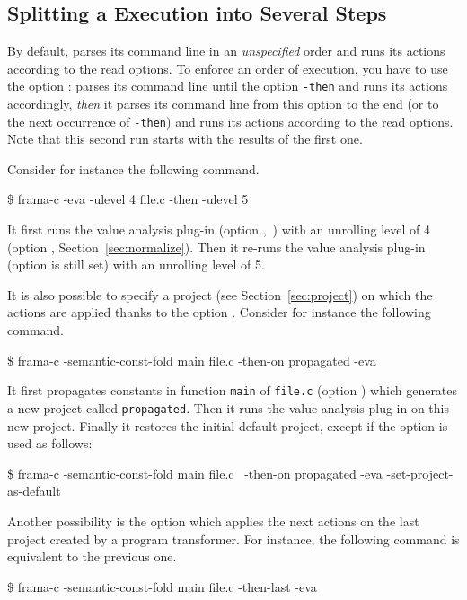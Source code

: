 \subsection{Splitting a \FramaC Execution into Several Steps}\label{sec:then}

By default, \FramaC parses its command line in an \emph{unspecified} order and
runs its actions according to the read options. To enforce an order of
execution, you have to use the option : \FramaC parses its
command line until the option \texttt{-then} and runs its actions accordingly,
\emph{then} it parses its command line from this option to the end (or to the
next occurrence of \texttt{-then}) and runs its actions according to the read
options. Note that this second run starts with the results of the first one.

Consider for instance the following command.
\begin{frama-c-commands}
\$ frama-c -eva -ulevel 4 file.c -then -ulevel 5
\end{frama-c-commands}
It first runs the value analysis plug-in (option
,~\cite{value}) with an unrolling level of 4 (option
, Section~\ref{sec:normalize}). Then it re-runs the value
analysis plug-in (option  is still set) with an unrolling
level of 5.

It is also possible to specify a project (see Section~\ref{sec:project}) on
which the actions are applied thanks to the option .
Consider for instance the following command.
\begin{frama-c-commands}
\$ frama-c -semantic-const-fold main file.c -then-on propagated -eva
\end{frama-c-commands}
It first propagates constants in function \texttt{main} of \texttt{file.c}
(option ) which generates a new project
called \texttt{propagated}. Then it runs the value analysis plug-in on this new
project. Finally it restores the initial default project, except if the option
 is used as follows:
\begin{frama-c-commands}
\$ frama-c -semantic-const-fold main file.c \
          -then-on propagated -eva -set-project-as-default
\end{frama-c-commands}

Another possibility is the option  which applies the
next actions on the last project created by a program transformer. For
instance, the following command is equivalent to the previous one.
\begin{frama-c-commands}
\$ frama-c -semantic-const-fold main file.c -then-last -eva
\end{frama-c-commands}

